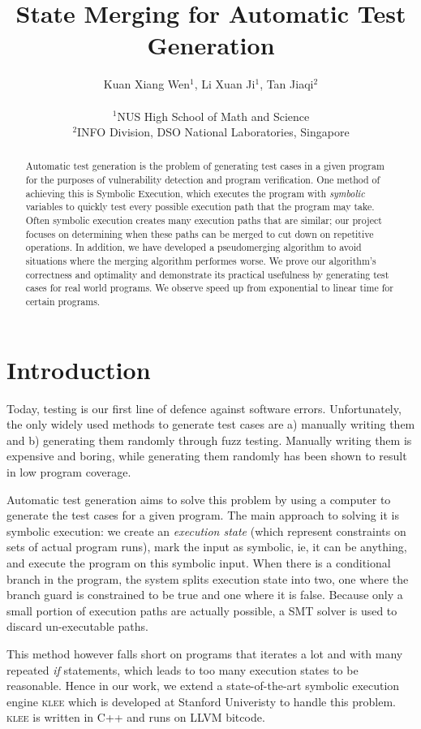 \documentclass[12pt,a4paper]{article}
\title{State Merging for Automatic Test Generation}
\date{}
\author{
Kuan Xiang Wen$^{1}$, Li Xuan Ji$^{1}$, Tan Jiaqi$^{2}$\\
\vspace{1 mm} \\
\small{$^{1}$NUS High School of Math and Science}\\
\small{$^{2}$INFO Division, DSO National Laboratories, Singapore}
}
\newcommand{\klee}{\textsc{klee }}
\begin{document}
\maketitle
\begin{abstract}
Automatic test generation is the problem of generating test cases in a given program for the purposes of vulnerability detection and program verification. One method of achieving this is Symbolic Execution, which executes the program with \emph{symbolic} variables to quickly test every possible execution path that the program may take. Often symbolic execution creates many execution paths that are similar; our project focuses on determining when these paths can be merged to cut down on repetitive operations. In addition, we have developed a pseudomerging algorithm to avoid situations where the merging algorithm performes worse. We prove our algorithm's correctness and optimality and demonstrate its practical usefulness by generating test cases for real world programs. We observe speed up from exponential to linear time for certain programs.
\end{abstract}

\section{Introduction}
Today, testing is our first line of defence against software errors. Unfortunately, the only widely used methods to generate test cases are a) manually writing them and b) generating them randomly through fuzz testing. Manually writing them is expensive and boring, while generating them randomly has been shown to result in low program coverage. 

Automatic test generation aims to solve this problem by using a computer to generate the test cases for a given program. The main approach to solving it is symbolic execution: we create an \emph{execution state} (which represent constraints on sets of actual program runs), mark the input as symbolic, ie, it can be anything, and execute the program on this symbolic input. When there is a conditional branch in the program, the system splits execution state into two, one where the branch guard is constrained to be true and one where it is false. Because only a small portion of execution paths are actually possible, a SMT solver is used to discard un-executable paths.

This method however falls short on programs that iterates a lot and with many repeated \emph{if} statements, which leads to too many execution states to be reasonable. Hence in our work, we extend a state-of-the-art symbolic execution engine \klee which is developed at Stanford Univeristy to handle this problem. \klee is written in C++ and runs on LLVM bitcode.
\end{document}
